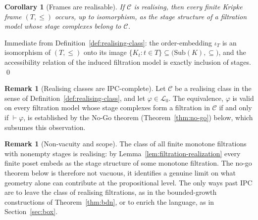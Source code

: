 \documentclass[final,12pt]{elsarticle}
\theoremstyle{plain}
\newtheorem{cor}[thm]{Corollary}
\theoremstyle{definition}
\newtheorem{rem}[thm]{Remark}
\begin{document}
\begin{cor}[Frames are realisable]
\label{cor:frames-realisable}
If \(\mathcal{C}\) is realising, then every finite Kripke frame \((T,\le)\)
occurs, up to isomorphism, as the stage structure of a filtration model whose
stage complexes belong to \(\mathcal{C}\).
\end{cor}

\proof
Immediate from Definition~\ref{def:realising-class}: the order-embedding
\(\iota_T\) is an isomorphism of \((T,\le)\) onto its image
\(\{K_t : t\in T\}\subseteq\bigl(\mathrm{Sub}(K),\subseteq\bigr)\), and the
accessibility relation of the induced filtration model is exactly inclusion of
stages.
\qed

\begin{rem}[Realising classes are IPC-complete]
\label{rem:realising-complete}
Let \(\mathcal{C}\) be a realising class in the sense of
Definition~\ref{def:realising-class}, and let \(\varphi\in\mathcal{L}_0\).  The
equivalence, \(\varphi\) is valid on every filtration model whose stage complexes
form a filtration in \(\mathcal{C}\) if and only if \(\vdash\varphi\), is
established by the No-Go theorem (Theorem~\ref{thm:no-go}) below, which subsumes
this observation.
\end{rem}


\begin{rem}[Non-vacuity and scope]
\label{rem:realising-nonvacuous}
The class of all finite monotone filtrations with nonempty stages is realising:
by Lemma~\ref{lem:filtration-realization} every finite poset embeds as the stage
structure of some monotone filtration.  The no-go theorem below is therefore not
vacuous, it identifies a genuine limit on what geometry alone can contribute at
the propositional level.  The only ways past IPC are to leave the class of
realising filtrations, as in the bounded-growth constructions of
Theorem~\ref{thm:bdn}, or to enrich the language, as in Section~\ref{sec:box}.
\end{rem}
\end{document}
